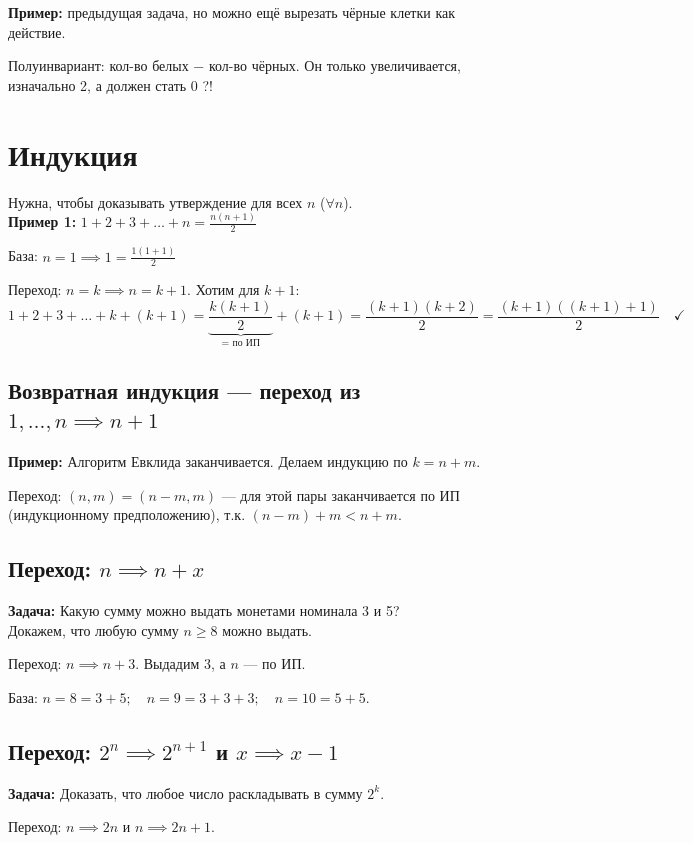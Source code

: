 \documentclass[10pt, a4paper]{article}
\begin{document}
\textbf{Пример:} предыдущая задача, но можно ещё вырезать чёрные клетки как действие.

\noindent Полуинвариант: кол-во белых $-\,\, \text{кол-во}$ чёрных. Он только увеличивается, изначально 2, а должен стать 0 ?!

\section*{Индукция}

Нужна, чтобы доказывать утверждение для всех $n$ ($\forall n$).\\

\noindent \textbf{Пример 1:} $1 + 2 + 3 + \dots + n = \frac{n(n+1)}{2}$

\noindent База: $n = 1 \implies 1 = \frac{1(1+1)}{2}$

\noindent Переход: $n = k \implies n = k+1$. Хотим для $k+1$:
\[ 1 + 2 + 3 + \dots + k + (k+1) = \underbrace{\frac{k(k+1)}{2}}_{\text{= по ИП}} + (k+1) = \frac{(k+1)(k+2)}{2} = \frac{(k+1)((k+1)+1)}{2} \quad \checkmark \]

\subsection*{Возвратная индукция --- переход из $1, \dots, n \implies n+1$}

\textbf{Пример:} Алгоритм Евклида заканчивается. Делаем индукцию по $k = n + m$.

\noindent Переход: $(n, m) = (n - m, m)$ --- для этой пары заканчивается по ИП (индукционному предположению), т.к. $(n - m) + m < n + m$.

\subsection*{Переход: $n \implies n+x$}

\textbf{Задача:} Какую сумму можно выдать монетами номинала 3 и 5? \\
Докажем, что любую сумму $n \ge 8$ можно выдать.

\noindent Переход: $n \implies n+3$. Выдадим 3, а $n$ --- по ИП.

\noindent База: 
$n = 8 = 3 + 5; \quad n = 9 = 3 + 3 + 3; \quad n = 10 = 5 + 5$.

\subsection*{Переход: $2^n \implies 2^{n+1}$ и $x \implies x-1$}

\textbf{Задача:} Доказать, что любое число раскладывать в сумму $2^k$.

\noindent Переход: $n \implies 2n$ и $n \implies 2n+1$.
\end{document}
